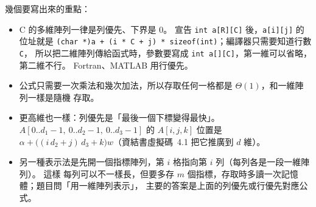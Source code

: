 \begin{pastsoln}
幾個要寫出來的重點：
\begin{itemize}
\item C 的多維陣列一律是列優先、下界是 $0$。 宣告 \texttt{int a[R][C]} 後，\texttt{a[i][j]}
的位址就是 \texttt{(char *)a + (i * C + j) * sizeof(int)}；編譯器只需要知道行數 \texttt{C}，
所以把二維陣列傳給函式時，參數要寫成 \texttt{int a[][C]}，第一維可以省略，第二維不行。
Fortran、MATLAB 用行優先。
\item 公式只需要一次乘法和幾次加法，所以存取任何一格都是 $\Theta(1)$，和一維陣列一樣是隨機
存取。
\item 更高維也一樣：列優先是「最後一個下標變得最快」。 $A[0..d_1 - 1,\ 0..d_2 - 1,\
0..d_3 - 1]$ 的 $A[i, j, k]$ 位置是 $\alpha + \bigl((i\,d_2 + j)\,d_3 + k\bigr)w$（資結書虛擬碼~4.1
把它推廣到 $d$ 維）。
\item 另一種表示法是先開一個指標陣列，第 $i$ 格指向第 $i$ 列（每列各是一段一維陣列）。 這樣
每列可以不一樣長，但要多存 $m$ 個指標，存取時多讀一次記憶體；題目問「用一維陣列表示」，
主要的答案是上面的列優先或行優先對應公式。
\end{itemize}
\end{pastsoln}

